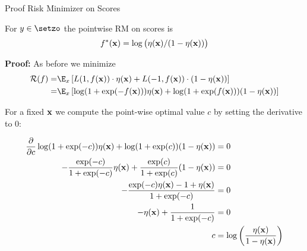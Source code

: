 \documentclass[11pt,compress,t,notes=noshow, xcolor=table]{beamer}
\begin{document}
\begin{frame2}[small]{Proof Risk Minimizer on Scores}

For $y \in \setzo$ the pointwise RM on scores is 
$$f^{\ast}(\mathbf{x}) =  \log \big(\eta(\mathbf{x})/(1-\eta(\mathbf{x}) )\big)$$

\textbf{Proof: } As before we minimize 
\begin{align*}
\riskf =& \E_x \left[L(1, \fx) \cdot \eta(\xv) + L(-1, \fx) \cdot (1 - \eta(\xv)) \right] \\
=& \E_x \left[ \log(1 + \exp(- \fx)) \eta(\xv)+ \log(1 + \exp(\fx)) (1 - \eta(\xv)) \right] 
\end{align*}

For a fixed $\mathbf{x}$ we compute the point-wise optimal value $c$ by setting the derivative to $0$: 

\begin{footnotesize}
\begin{align*}
\frac{\partial }{\partial c} \log(1 + \exp(-c)) \eta(\mathbf{x})+ \log(1 + \exp(c)) (1 - \eta(\mathbf{x})) &= 0 \\
- \frac{\exp(-c)}{1 + \exp(-c)} \eta(\mathbf{x}) + \frac{\exp(c)}{1 + \exp(c)} (1 - \eta(\mathbf{x})) &= 0 \\ 
- \frac{\exp(-c) \eta(\mathbf{x}) - 1 + \eta(\mathbf{x})}{1 + \exp(-c)} &= 0 \\
- \eta(\mathbf{x}) + \frac{1}{1 + \exp(-c)} &= 0\\
c &= \log\left(\frac{\eta(\mathbf{x})}{1 - \eta(\mathbf{x})}\right)
\end{align*}
\end{footnotesize}

\end{frame2}
\end{document}
